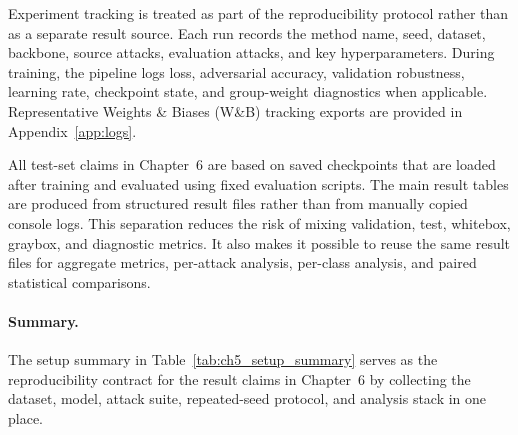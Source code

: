 Experiment tracking is treated as part of the reproducibility protocol rather than
as a separate result source. Each run records the method name, seed, dataset,
backbone, source attacks, evaluation attacks, and key hyperparameters. During
training, the pipeline logs loss, adversarial accuracy, validation robustness,
learning rate, checkpoint state, and group-weight diagnostics when applicable.
Representative Weights \& Biases (W\&B) tracking exports are provided in
Appendix~\ref{app:logs}.

All test-set claims in Chapter~6 are based on saved checkpoints that are loaded
after training and evaluated using fixed evaluation scripts. The main result
tables are produced from structured result files rather than from manually copied
console logs. This separation reduces the risk of mixing validation, test, whitebox, graybox, and diagnostic metrics. It
also makes it possible to reuse the same result files for aggregate metrics,
per-attack analysis, per-class analysis, and paired statistical comparisons.

\paragraph{Summary.}
The setup summary in Table~\ref{tab:ch5_setup_summary} serves as the reproducibility
contract for the result claims in Chapter~6 by collecting the dataset, model, attack
suite, repeated-seed protocol, and analysis stack in one place.

